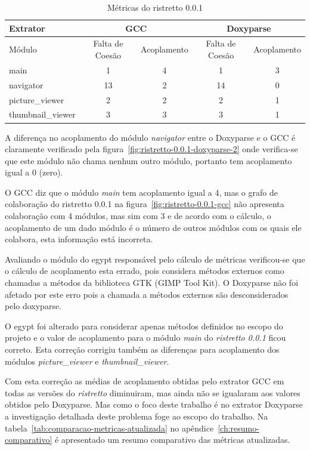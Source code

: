 \begin{table}
\caption{Métricas do ristretto 0.0.1}
\centering
\begin{tabular}{| l | c c | c c |}
\hline
Extrator          & \multicolumn{2}{|c|}{GCC}        & \multicolumn{2}{|c|}{Doxyparse} \\
\hline
Módulo            & Falta de Coesão & Acoplamento    & Falta de Coesão & Acoplamento   \\
\hline
main              & 1               & 4              & 1               & 3             \\
navigator         & 13              & 2              & 14              & 0             \\
picture\_viewer   & 2               & 2              & 2               & 1             \\
thumbnail\_viewer & 3               & 3              & 3               & 1             \\
\hline
\end{tabular}
\label{tab:comparacao-metricas-ristretto-0.0.1}
\end{table}

A diferença no acoplamento do módulo {\it navigator} entre o Doxyparse e o GCC
é claramente verificado pela figura~\ref{fig:ristretto-0.0.1-doxyparse-2} onde
verifica-se que este módulo não chama nenhum outro módulo, portanto tem
acoplamento igual a 0 (zero).

O GCC diz que o módulo {\it main} tem acoplamento igual a 4, mas o grafo de
colaboração do ristretto 0.0.1 na figura~\ref{fig:ristretto-0.0.1-gcc} não
apresenta colaboração com 4 módulos, mas sim com 3 e de acordo com o cálculo, o
acoplamento de um dado módulo é o número de outros módulos com os quais ele
colabora, esta informação está incorreta.

Avaliando o módulo do egypt responsável pelo cálculo de métricas verificou-se
que o cálculo de acoplamento esta errado, pois considera métodos externos
como chamadas a métodos da biblioteca GTK (GIMP Tool Kit). O Doxyparse não foi afetado por este erro pois a chamada a
métodos externos são desconsiderados pelo doxyparse.

O egypt foi alterado para considerar apenas métodos definidos no escopo do
projeto e o valor de acoplamento para o módulo {\it main} do {\it ristretto
0.0.1} ficou correto. Esta correção corrigiu também as diferenças para
acoplamento dos módulos {\it picture\_viewer} e {\it thumbnail\_viewer}.

Com esta correção as médias de acoplamento obtidas pelo extrator GCC em todas
as versões do {\it ristretto} diminuiram, mas ainda não se igualaram aos
valores obtidos pelo Doxyparse. Mas como o foco deste trabalho é no extrator
Doxyparse a investigação detalhada deste problema foge ao escopo do trabalho.
Na tabela~\ref{tab:comparacao-metricas-atualizada} no
apêndice~\ref{ch:resumo-comparativo} é apresentado um resumo comparativo das
métricas atualizadas.

